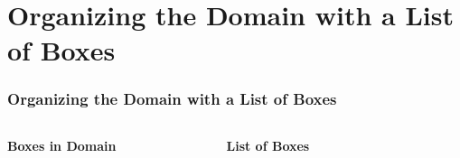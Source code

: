 \section{Organizing the Domain with a List of Boxes}
\begin{frame}
    \frametitle{Organizing the Domain with a List of Boxes}

    \begin{columns}[c]
    \textbf{Boxes in Domain}
    \begin{figure}[h]
        \centering
        \resizebox{.5\textwidth}{!}{%
            
        }
    \end{figure}

    \textbf{List of Boxes}
    \begin{figure}[h]
        \centering
        \resizebox{.5\textwidth}{!}{%
            
        }
    \end{figure}
    \end{columns}

\end{frame}


